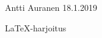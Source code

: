 \documentclass[a4paper,12pt]{article}
\begin{document}
\noindent Antti Auranen
\hfill 18.1.2019
\vspace{20mm}
\begin{center}
\huge{LaTeX-harjoitus}
\end{center}








\end{document}
